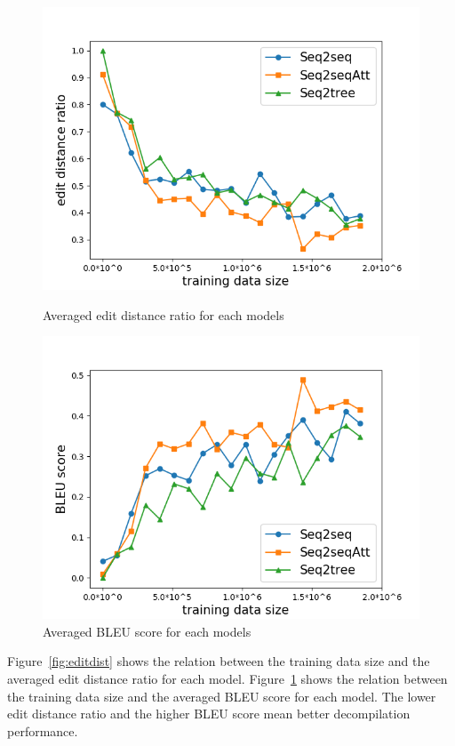 \documentclass[11pt]{jarticle}
\begin{document}
\begin{figure}[]
	\includegraphics[width=12cm]{edit_dist.png}
	\caption{Averaged edit distance ratio for each models}
	\label{fig:editdist}
	\includegraphics[width=12cm]{bleu.png}
	\caption{Averaged BLEU score for each models}
	\label{fig:bleu}
\end{figure}

Figure~\ref{fig:editdist} shows the relation between the training data size and the averaged edit distance ratio for each model.
Figure~\ref{fig:bleu} shows the relation between the training data size and the averaged BLEU score for each model.
The lower edit distance ratio and the higher BLEU score mean better decompilation performance.
\end{document}
